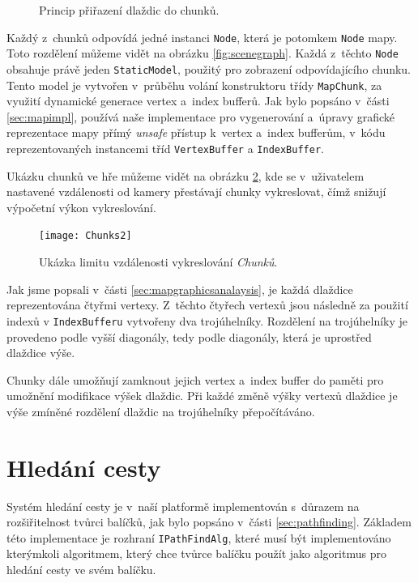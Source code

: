 \begin{figure}[h]
	\centering
	\fontsize{10pt}{12pt}\selectfont
	\def\svgwidth{0.7\textwidth}
	
	\caption{Princip přiřazení dlaždic do chunků.}
	\label{fig:mapdisplay}
\end{figure}

Každý z~chunků odpovídá jedné instanci \texttt{Node}, která je potomkem \texttt{Node} mapy. Toto rozdělení můžeme vidět na obrázku \ref{fig:scenegraph}. Každá z~těchto \texttt{Node} obsahuje právě jeden \texttt{StaticModel}, použitý pro zobrazení odpovídajícího chunku. Tento model je vytvořen v~průběhu volání konstruktoru třídy \texttt{MapChunk}, za využití dynamické generace vertex a~index bufferů. Jak bylo popsáno v~části \ref{sec:mapimpl}, používá naše implementace pro vygenerování a~úpravy grafické reprezentace mapy přímý \textit{unsafe} přístup k~vertex a~index bufferům, v~kódu reprezentovaných instancemi tříd \texttt{VertexBuffer} a \texttt{IndexBuffer}.


Ukázku chunků ve hře můžeme vidět na obrázku \ref{fig:chunks}, kde se v~uživatelem nastavené vzdálenosti od kamery přestávají chunky vykreslovat, čímž snižují výpočetní výkon vykreslování.

\begin{figure}[h]
	\centering
	\texttt{[image: Chunks2]}
	\caption{Ukázka limitu vzdálenosti vykreslování \textit{Chunků}.}
	\label{fig:chunks}
\end{figure}

Jak jsme popsali v~části \ref{sec:mapgraphicsanalaysis}, je každá dlaždice reprezentována čtyřmi vertexy. Z~těchto čtyřech vertexů jsou následně za použití indexů v \texttt{IndexBufferu} vytvořeny dva trojúhelníky. Rozdělení na trojúhelníky je provedeno podle vyšší diagonály, tedy podle diagonály, která je uprostřed dlaždice výše. 

Chunky dále umožňují zamknout jejich vertex a~index buffer do paměti pro umožnění modifikace výšek dlaždic. Při každé změně výšky vertexů dlaždice je výše zmíněné rozdělení dlaždic na trojúhelníky přepočítáváno.

\section{Hledání cesty}
\label{sec:pathfindingdocu}
Systém hledání cesty je v~naší platformě implementován s~důrazem na rozšiřitelnost tvůrci balíčků, jak bylo popsáno v~části \ref{sec:pathfinding}. Základem této implementace je rozhraní \texttt{IPathFindAlg}, které musí být implementováno kterýmkoli algoritmem, který chce tvůrce balíčku použít jako algoritmus pro hledání cesty ve svém balíčku.


